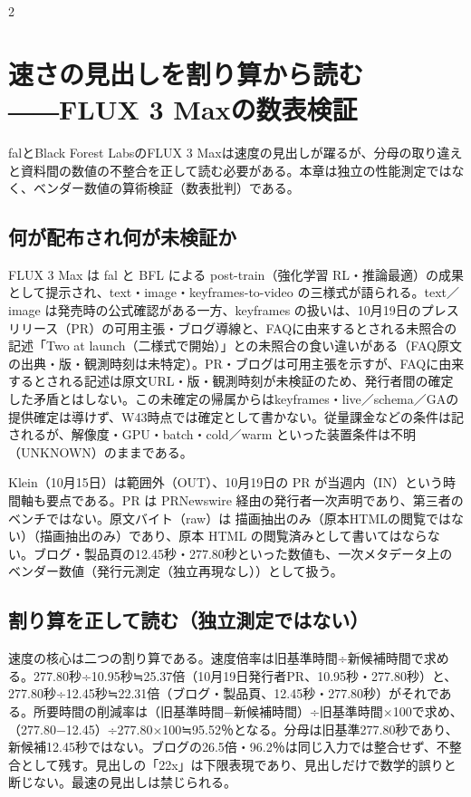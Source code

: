 \documentclass[lualatex,a4paper,10pt]{jlreq}
\begin{document}
\begin{multicols}{2} %


\section{速さの見出しを割り算から読む――FLUX 3 Maxの数表検証}
\label{sec:P4}


falとBlack Forest LabsのFLUX 3 Maxは速度の見出しが躍るが、分母の取り違えと資料間の数値の不整合を正して読む必要がある。本章は独立の性能測定ではなく、ベンダー数値の算術検証（数表批判）である。


\subsection*{何が配布され何が未検証か}


FLUX 3 Max は fal と BFL による post-train（強化学習 RL・推論最適）の成果として提示され、text・image・keyframes-to-video の三様式が語られる。text／image は発売時の公式確認がある一方、keyframes の扱いは、10月19日のプレスリリース（PR）の可用主張・ブログ導線と、FAQに由来するとされる未照合の記述「Two at launch（二様式で開始）」との未照合の食い違いがある（FAQ原文の出典・版・観測時刻は未特定）。PR・ブログは可用主張を示すが、FAQに由来するとされる記述は原文URL・版・観測時刻が未検証のため、発行者間の確定した矛盾とはしない。この未確定の帰属からはkeyframes・live／schema／GAの提供確定は導けず、W43時点では確定として書かない。従量課金などの条件は記されるが、解像度・GPU・batch・cold／warm といった装置条件は不明（UNKNOWN）のままである。


Klein（10月15日）は範囲外（OUT）、10月19日の PR が当週内（IN）という時間軸も要点である。PR は PRNewswire 経由の発行者一次声明であり、第三者のベンチではない。原文バイト（raw）は 描画抽出のみ（原本HTMLの閲覧ではない）（描画抽出のみ）であり、原本 HTML の閲覧済みとして書いてはならない。ブログ・製品頁の12.45秒・277.80秒といった数値も、一次メタデータ上のベンダー数値（発行元測定（独立再現なし））として扱う。


\subsection*{割り算を正して読む（独立測定ではない）}


速度の核心は二つの割り算である。速度倍率は旧基準時間÷新候補時間で求める。277.80秒÷10.95秒≒25.37倍（10月19日発行者PR、10.95秒・277.80秒）と、277.80秒÷12.45秒≒22.31倍（ブログ・製品頁、12.45秒・277.80秒）がそれである。所要時間の削減率は（旧基準時間−新候補時間）÷旧基準時間×100で求め、（277.80−12.45）÷277.80×100≒95.52％となる。分母は旧基準277.80秒であり、新候補12.45秒ではない。ブログの26.5倍・96.2％は同じ入力では整合せず、不整合として残す。見出しの「22x」は下限表現であり、見出しだけで数学的誤りと断じない。最速の見出しは禁じられる。


\end{multicols} %
\end{document}
